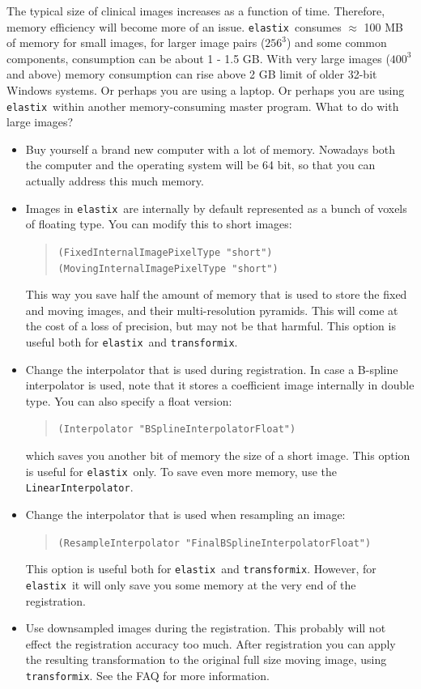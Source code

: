 \documentclass[]{report}
\newcommand{\elastix}{\texttt{elastix}}
\newcommand{\transformix}{\texttt{transformix}}
\begin{document}
The typical size of clinical images increases as a function of time.
Therefore, memory efficiency will become more of an issue. \elastix\
consumes $\approx$ 100 MB of memory for small images, for larger
image pairs ($256^3$) and some common components, consumption can be
about 1 - 1.5 GB. With very large images ($400^3$ and above) memory
consumption can rise above 2 GB limit of older 32-bit Windows
systems. Or perhaps you are using a laptop. Or perhaps you are using
\elastix\ within another memory-consuming master program. What to do
with large images?
\begin{itemize}
\item Buy yourself a brand new computer with a lot of memory.
Nowadays both the computer and the operating system will be 64 bit,
so that you can actually address this much memory.

\item Images in \elastix\ are internally by default represented as a bunch of
voxels of floating type. You can modify this to short images:
\begin{quote}
\texttt{(FixedInternalImagePixelType "short")} \\
\texttt{(MovingInternalImagePixelType "short")}
\end{quote}
This way you save half the amount of memory that is used to store the
fixed and moving images, and their multi-resolution pyramids. This
will come at the cost of a loss of precision, but may not be that
harmful. This option is useful both for \elastix\ and \transformix.

\item Change the interpolator that is used during registration. In case
a B-spline interpolator is used, note that it stores a coefficient
image internally in double type. You can also specify a float
version:
\begin{quote}
\texttt{(Interpolator "BSplineInterpolatorFloat")}
\end{quote}
which saves you another bit of memory the size of a short image.
This option is useful for \elastix\ only. To save even more memory,
use the \texttt{LinearInterpolator}.

\item Change the interpolator that is used when resampling an image:
\begin{quote}
\texttt{(ResampleInterpolator "FinalBSplineInterpolatorFloat")}
\end{quote}
This option is useful both for \elastix\ and \transformix. However,
for \elastix\ it will only save you some memory at the very end of
the registration.

\item Use downsampled images during the registration. This probably
will not effect the registration accuracy too much. After
registration you can apply the resulting transformation to the
original full size moving image, using \transformix. See the FAQ for
more information.

\end{itemize}
\end{document}

